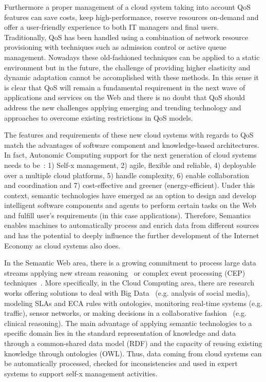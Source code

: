 Furthermore a proper management of a cloud system taking into account QoS 
features can save costs, keep high-performance, reserve resources on-demand and 
offer a user-friendly experience to both IT managers and final users. 
Traditionally, QoS has been handled using a combination of network resource 
provisioning with techniques such as admission control or active queue 
management. Nowadays these old-fashioned techniques can be applied to a static 
environment but in the future, the challenge of providing higher elasticity and 
dynamic adaptation cannot be accomplished with these methods. In this sense it 
is clear that QoS will remain a fundamental requirement in the next wave of 
applications and services on the Web and there is no doubt that QoS should 
address the new challenges applying emerging and trending technology and 
approaches to overcome existing restrictions in QoS models.

The features and requirements of these new cloud systems with regards 
to QoS~\cite{Pedersen:2011:AMQ:2114495.2115542} match the advantages of software component and 
knowledge-based architectures. In fact, Autonomic Computing support for the next generation of cloud systems 
needs to be~\cite{Conejero:2012:MSQ:2357487.2357591,Pedersen:2011:AMQ:2114495.2115542}: 
1) Self-x management, 2) agile, flexible and reliable, 4) deployable over a multiple cloud platforms, 5) handle complexity, 6) enable 
collaboration and coordination and 7) cost-effective and greener 
(energy-efficient). Under this context, semantic technologies have emerged as an 
option to design and develop intelligent software components and agents to 
perform certain tasks on the Web and fulfill user's requirements (in this case 
applications). Therefore, Semantics enables machines to automatically process 
and enrich data from different sources and has the potential to deeply influence 
the further development of the Internet Economy as cloud systems also does.

In the Semantic Web area, there is a growing commitment to process large data streams applying 
new stream reasoning~\cite{Bolles:2008:SSE:1789394.1789438,Barbieri:2010:EEC:1739041.1739095} 
or complex event processing (CEP) techniques~\cite{Anicic:2011:EUL:1963405.1963495}. More specifically, in the Cloud Computing area, there are research works offering 
solutions to deal with Big Data~\cite{Fan:2013:MBD:2481244.2481246} (e.g. analysis of social media), modeling SLAs and ECA rules with ontologies, 
monitoring real-time systems (e.g. traffic), sensor networks, or making decisions in a collaborative fashion~\cite{RodriGuez-GonzaLez:2012:UAP:2350799.2350907} (e.g. clinical reasoning). 
The main advantage of applying semantic technologies to a specific domain lies in the standard representation of knowledge and data through a common-shared data model (RDF) and the 
capacity of reusing existing knowledge through ontologies (OWL). Thus, data coming from cloud systems can be automatically processed, checked for inconsistencies and 
used in expert systems to support self-x management activities.

